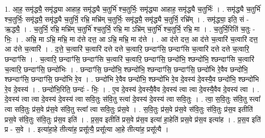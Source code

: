 \documentclass[17pt]{extarticle}
\begin{document}
1. आ॒ह॒ समृ॑द्ध्यै॒ समृ॑द्ध्या आहाह॒ समृ॑द्ध्यै च॒तुर्भि॑ श्च॒तुर्भिः॒ समृ॑द्ध्या आहाह॒ समृ॑द्ध्यै च॒तुर्भिः॑ । . समृ॑द्ध्यै च॒तुर्भि॑ श्च॒तुर्भिः॒ समृ॑द्ध्यै॒ समृ॑द्ध्यै च॒तुर्भि॒ रभ्रि॒ मभ्रि॑म् च॒तुर्भिः॒ समृ॑द्ध्यै॒ समृ॑द्ध्यै च॒तुर्भि॒ रभ्रि᳚म् । . समृ॑द्ध्या॒ इति॒ सं - ऋ॒द्ध्यै॒ । . च॒तुर्भि॒ रभ्रि॒ मभ्रि॑म् च॒तुर्भि॑ श्च॒तुर्भि॒ रभ्रि॒ मा ऽभ्रि॑म् च॒तुर्भि॑ श्च॒तुर्भि॒ रभ्रि॒ मा । . च॒तुर्भि॒रिति॑ च॒तुः - भिः॒ । . अभ्रि॒ मा ऽभ्रि॒ मभ्रि॒ मा द॑त्ते दत्त॒ आ ऽभ्रि॒ मभ्रि॒ मा द॑त्ते । . आ द॑त्ते दत्त॒ आ द॑त्ते च॒त्वारि॑ च॒त्वारि॑ दत्त॒ आ द॑त्ते च॒त्वारि॑ । . द॒त्ते॒ च॒त्वारि॑ च॒त्वारि॑ दत्ते दत्ते च॒त्वारि॒ छन्दाꣳ॑सि॒ छन्दाꣳ॑सि च॒त्वारि॑ दत्ते दत्ते च॒त्वारि॒ छन्दाꣳ॑सि । . च॒त्वारि॒ छन्दाꣳ॑सि॒ छन्दाꣳ॑सि च॒त्वारि॑ च॒त्वारि॒ छन्दाꣳ॑सि॒ छन्दो॑भि॒ श्छन्दो॑भि॒ श्छन्दाꣳ॑सि च॒त्वारि॑ च॒त्वारि॒ छन्दाꣳ॑सि॒ छन्दो॑भिः । . छन्दाꣳ॑सि॒ छन्दो॑भि॒ श्छन्दो॑भि॒ श्छन्दाꣳ॑सि॒ छन्दाꣳ॑सि॒ छन्दो॑भि रे॒वैव छन्दो॑भि॒ श्छन्दाꣳ॑सि॒ छन्दाꣳ॑सि॒ छन्दो॑भि रे॒व । . छन्दो॑भि रे॒वैव छन्दो॑भि॒ श्छन्दो॑भि रे॒व दे॒वस्य॑ दे॒वस्यै॒व छन्दो॑भि॒ श्छन्दो॑भि रे॒व दे॒वस्य॑ । . छन्दो॑भि॒रिति॒ छन्दः॑ - भिः॒ । . ए॒व दे॒वस्य॑ दे॒वस्यै॒वैव दे॒वस्य॑ त्वा त्वा दे॒वस्यै॒वैव दे॒वस्य॑ त्वा । . दे॒वस्य॑ त्वा त्वा दे॒वस्य॑ दे॒वस्य॑ त्वा सवि॒तुः स॑वि॒तु स्त्वा॑ दे॒वस्य॑ दे॒वस्य॑ त्वा सवि॒तुः । . त्वा॒ स॒वि॒तुः स॑वि॒तु स्त्वा᳚ त्वा सवि॒तुः प्र॑स॒वे प्र॑स॒वे स॑वि॒तु स्त्वा᳚ त्वा सवि॒तुः प्र॑स॒वे । . स॒वि॒तुः प्र॑स॒वे प्र॑स॒वे स॑वि॒तुः स॑वि॒तुः प्र॑स॒व इतीति॑ प्रस॒वे स॑वि॒तुः स॑वि॒तुः प्र॑स॒व इति॑ । . प्र॒स॒व इतीति॑ प्रस॒वे प्र॑स॒व इत्या॑ हा॒हेति॑ प्रस॒वे प्र॑स॒व इत्या॑ह । . प्र॒स॒व इति॑ प्र - स॒वे । . इत्या॑हा॒हे तीत्या॑ह॒ प्रसू᳚त्यै॒ प्रसू᳚त्या आ॒हे तीत्या॑ह॒ प्रसू᳚त्यै । \newline
\end{document}

